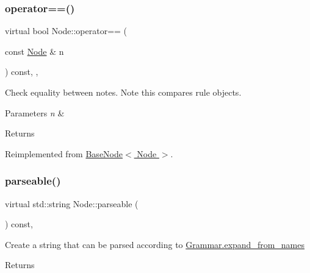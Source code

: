 \mbox{\label{class_node_a8f42de356c047dd52472d24ace4d42c5}} 
\subsubsection{\texorpdfstring{operator==()}{operator==()}}
{\footnotesize\ttfamily virtual bool Node\+::operator== (\begin{DoxyParamCaption}\item[{const \hyperlink{class_node}{Node} \&}]{n }\end{DoxyParamCaption}) const\hspace{0.3cm}{\ttfamily [inline]}, {\ttfamily [override]}, {\ttfamily [virtual]}}

Check equality between notes. Note this compares rule objects. 
\begin{DoxyParams}{Parameters}
{\em n} & \\
\hline
\end{DoxyParams}
\begin{DoxyReturn}{Returns}

\end{DoxyReturn}


Reimplemented from \hyperlink{class_base_node_a33bb5c59122f6b2778d39a0eaa0151d7}{Base\+Node$<$ Node $>$}.

\mbox{\label{class_node_a70e879ceb71f47787137572d9bee8efa}} 
\subsubsection{\texorpdfstring{parseable()}{parseable()}}
{\footnotesize\ttfamily virtual std\+::string Node\+::parseable (\begin{DoxyParamCaption}{ }\end{DoxyParamCaption}) const\hspace{0.3cm}{\ttfamily [inline]}, {\ttfamily [virtual]}}

Create a string that can be parsed according to \hyperlink{class_grammar_aef582b15696b97c3376cba935a76acef}{Grammar.\+expand\+\_\+from\+\_\+names} \begin{DoxyReturn}{Returns}

\end{DoxyReturn}
\mbox{\label{class_node_a377548bcf1be99ac5181f9434c33c81e}} 

